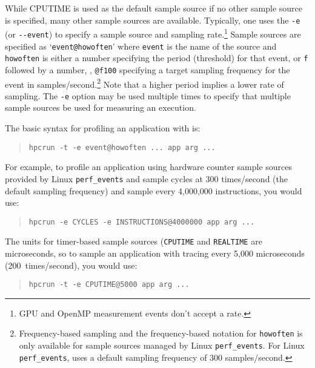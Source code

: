 While CPUTIME is used as the default sample source if no other sample source is specified, many other sample sources are available.
Typically, one uses the \verb|-e| (or \verb|--event|) to
specify a sample source and sampling rate.\footnote{GPU and OpenMP measurement events don't accept a rate.}
Sample sources are specified as `\verb|event@howoften|'
where \verb|event| is the name of the source and \verb|howoften| is either
a number specifying the period (threshold) for that event, or \verb|f| followed by a number, \eg{}, \verb|@f100| 
specifying a target sampling frequency for the event in samples/second.\footnote{Frequency-based sampling and 
the frequency-based notation for {\tt howoften} is only
available for sample sources managed by Linux {\tt perf\_events}. For Linux {\tt perf\_events}, \HPCToolkit{} uses 
a default sampling frequency of 300 samples/second.}
Note that a higher period implies a lower rate of sampling.  
The \verb|-e| option may be used multiple times to specify that multiple
sample sources be used for measuring an execution.  

The basic syntax for profiling an application with
\hpcrun{} is:

\begin{quote}
\begin{verbatim}
hpcrun -t -e event@howoften ... app arg ...
\end{verbatim}
\end{quote}

For example, to profile an application using hardware counter sample sources
provided by Linux \verb|perf_events| and sample cycles at 300 times/second (the default sampling frequency) and sample every 4,000,000 instructions, 
you would use:

\begin{quote}
\begin{verbatim}
hpcrun -e CYCLES -e INSTRUCTIONS@4000000 app arg ...
\end{verbatim}
\end{quote}

The units for timer-based sample sources (\verb|CPUTIME| and \verb|REALTIME| are microseconds,
so to sample an application with tracing every 5,000 microseconds
(200~times/second), you would use:

\begin{quote}
\begin{verbatim}
hpcrun -t -e CPUTIME@5000 app arg ...
\end{verbatim}
\end{quote}

